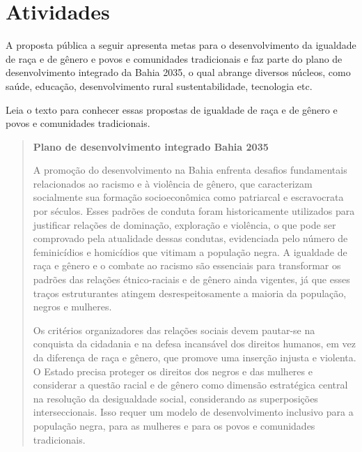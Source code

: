 \section{Atividades}

A proposta pública a seguir apresenta metas para o desenvolvimento da
igualdade de raça e de gênero e povos e comunidades tradicionais e faz
parte do plano de desenvolvimento integrado da Bahia 2035, o qual
abrange diversos núcleos, como saúde, educação, desenvolvimento rural
sustentabilidade, tecnologia etc.

Leia o texto para conhecer essas propostas de igualdade de raça e de
gênero e povos e comunidades tradicionais.

\begin{quote}
\textbf{Plano de desenvolvimento integrado Bahia 2035}


A promoção do desenvolvimento na Bahia enfrenta desafios fundamentais
relacionados ao racismo e à violência de gênero, que caracterizam
socialmente sua formação socioeconômica como patriarcal e escravocrata
por séculos. Esses padrões de conduta foram historicamente utilizados
para justificar relações de dominação, exploração e violência, o que
pode ser comprovado pela atualidade dessas condutas, evidenciada pelo
número de feminicídios e homicídios que vitimam a população negra. A
igualdade de raça e gênero e o combate ao racismo são essenciais para
transformar os padrões das relações étnico-raciais e de gênero ainda
vigentes, já que esses traços estruturantes atingem desrespeitosamente a
maioria da população, negros e mulheres.

Os critérios organizadores das relações sociais devem pautar-se na
conquista da cidadania e na defesa incansável dos direitos humanos, em
vez da diferença de raça e gênero, que promove uma inserção injusta e
violenta. O Estado precisa proteger os direitos dos negros e das
mulheres e considerar a questão racial e de gênero como dimensão
estratégica central na resolução da desigualdade social, considerando as
superposições interseccionais. Isso requer um modelo de desenvolvimento
inclusivo para a população negra, para as mulheres e para os povos e
comunidades tradicionais.


\end{quote}
